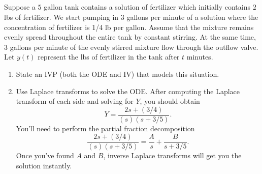 \subsection*{\ideaC}
\begin{problem}
Suppose a $5$ gallon tank contains a solution of fertilizer which initially contains $2$ lbs of fertilizer. We start pumping in $3$ gallons per minute of a solution where the concentration of fertilizer is 1/4 lb per gallon. 
Assume that the mixture remains evenly spread throughout the entire tank by constant stirring. 
At the same time, 3 gallons per minute of the evenly stirred mixture flow through the outflow valve. 
Let $y(t)$ represent the lbs of fertilizer in the tank after $t$ minutes.
\begin{enumerate}
 \item 
State an IVP (both the ODE and IV) that models this situation.  
 \item Use Laplace transforms to solve the ODE. After computing the Laplace transform of each side and solving for $Y$, you should obtain 
$$Y= \frac{2s+(3/4)}{(s)(s+3/5)}.$$ You'll need to perform the partial fraction decomposition
%
$$\frac{2s+(3/4)}{(s)(s+3/5)} = \frac{A}{s}+\frac{B}{s+3/5}.$$ Once you've found $A$ and $B$, inverse Laplace transforms will get you the solution instantly.
\end{enumerate}
\end{problem}


